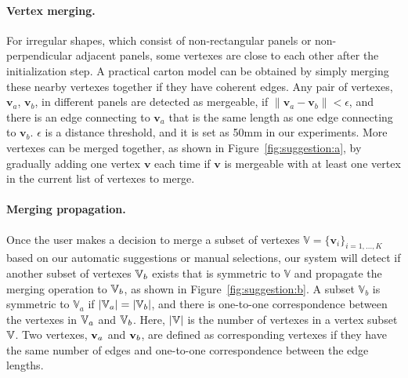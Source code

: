 \paragraph{Vertex merging.} 
For irregular shapes, which consist of non-rectangular panels or non-perpendicular adjacent panels, some vertexes are close to each other after the initialization step.
A practical carton model can be obtained by simply merging these nearby vertexes together if they have coherent edges.
%
Any pair of vertexes, $\mathbf{v}_a$, $\mathbf{v}_b$, in different panels are detected as mergeable, if $\|\mathbf{v}_a-\mathbf{v}_b\|<\epsilon$, and there is an edge connecting to $\mathbf{v}_a$ that is the same length as one edge connecting to $\mathbf{v}_b$.
%
$\epsilon$ is a distance threshold, and it is set as 50mm in our experiments.
More vertexes can be merged together, as shown in Figure~\ref{fig:suggestion:a}, by gradually adding one vertex $\mathbf{v}$ each time if $\mathbf{v}$ is mergeable with at least one vertex in the current list of vertexes to merge.  

\paragraph{Merging propagation.}  
Once the user makes a decision to merge a subset of vertexes $\mathbb{V}=\{\mathbf{v}_i\}_{i=1,\ldots,K}$ based on our automatic suggestions or manual selections, our system will detect if another subset of vertexes $\mathbb{V}_b$ exists that is symmetric to $\mathbb{V}$ and propagate the merging operation to $\mathbb{V}_b$, as shown in Figure~\ref{fig:suggestion:b}. 
A subset $\mathbb{V}_b$ is symmetric to $\mathbb{V}_a$ if $|\mathbb{V}_a|=|\mathbb{V}_b|$, and there is one-to-one correspondence between the vertexes in $\mathbb{V}_a$ and $\mathbb{V}_b$. 
Here, $|\mathbb{V}|$ is the number of vertexes in a vertex subset $\mathbb{V}$. 
Two vertexes, $\mathbf{v}_a$ and $\mathbf{v}_b$, are defined as corresponding vertexes if they have the same number of edges and one-to-one correspondence between the edge lengths. 


